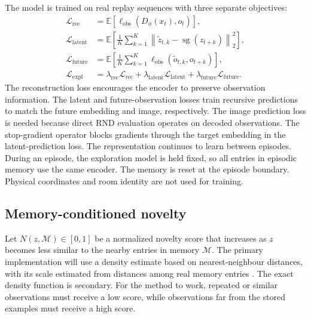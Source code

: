 \documentclass{article}
\begin{document}
The model is trained on real replay sequences with three separate objectives:
\begin{align}
    \mathcal{L}_{\mathrm{rec}}
        &=\mathbb{E}\left[
          \ell_{\mathrm{obs}}(D_\phi(x_t),o_t)
          \right], \\
    \mathcal{L}_{\mathrm{latent}}
        &=\mathbb{E}\left[
          \frac{1}{K}\sum_{k=1}^{K}
          \left\|\tilde z_{t,k}
          -\operatorname{sg}(z_{t+k})\right\|_2^2
          \right], \\
    \mathcal{L}_{\mathrm{future}}
        &=\mathbb{E}\left[
          \frac{1}{K}\sum_{k=1}^{K}
          \ell_{\mathrm{obs}}(\tilde o_{t,k},o_{t+k})
          \right], \\
    \mathcal{L}_{\mathrm{expl}}
        &=\lambda_{\mathrm{rec}}\mathcal{L}_{\mathrm{rec}}
          +\lambda_{\mathrm{latent}}\mathcal{L}_{\mathrm{latent}}
          +\lambda_{\mathrm{future}}\mathcal{L}_{\mathrm{future}}.
\end{align}
The reconstruction loss encourages the encoder to preserve observation
information. The latent and future-observation losses train recursive
predictions to match the future embedding and image, respectively. The image
prediction loss is needed because direct RND evaluation operates on decoded
observations. The stop-gradient operator blocks gradients through the target
embedding in the latent-prediction loss. The representation continues to learn
between episodes. During an episode, the exploration model is held fixed, so
all entries in episodic memory use the same encoder. The memory is reset at the
episode boundary. Physical coordinates and room identity are not used for
training.

\subsection{Memory-conditioned novelty}

Let $N(z,\mathcal{M})\in[0,1]$ be a normalized novelty score that increases as
$z$ becomes less similar to the nearby entries in memory $\mathcal{M}$. The
primary implementation will use a density estimate based on nearest-neighbour
distances, with its scale estimated from distances among real memory entries
\citep{ngu}.
The exact density function is secondary. For the method to work, repeated or
similar observations must receive a low score, while observations far from the
stored examples must receive a high score.
\end{document}
